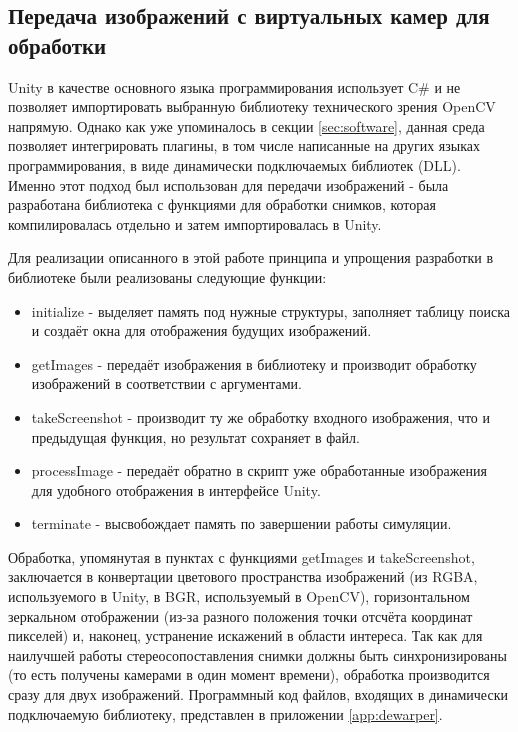 \subsection{Передача изображений с виртуальных камер для обработки}

Unity в качестве основного языка программирования использует C\# и не позволяет импортировать 
выбранную библиотеку технического зрения OpenCV напрямую. Однако как уже упоминалось в секции 
\ref{sec:software}, данная среда позволяет интегрировать плагины, в том числе написанные на 
других языках программирования, в виде динамически подключаемых библиотек (DLL). Именно этот 
подход был использован для передачи изображений - была разработана библиотека с функциями для 
обработки снимков, которая компилировалась отдельно и затем импортировалась в Unity. 

Для реализации описанного в этой работе принципа и упрощения разработки в библиотеке были реализованы 
следующие функции:
\begin{itemize}
    \item initialize - выделяет память под нужные структуры, заполняет таблицу поиска и создаёт окна 
    для отображения будущих изображений.
    \item getImages - передаёт изображения в библиотеку и производит обработку изображений в 
    соответствии с аргументами. 
    \item takeScreenshot - производит ту же обработку входного изображения, что и предыдущая функция,
     но результат сохраняет в файл. 
    \item processImage - передаёт обратно в скрипт уже обработанные изображения для удобного отображения
    в интерфейсе Unity. 
    \item terminate - высвобождает память по завершении работы симуляции.      
\end{itemize}

Обработка, упомянутая в пунктах с функциями getImages и takeScreenshot, заключается в конвертации 
цветового пространства изображений (из RGBA, используемого в Unity, в BGR, используемый в OpenCV), 
горизонтальном зеркальном отображении (из-за разного положения точки отсчёта координат пикселей)
и, наконец, устранение искажений в области интереса. Так как для наилучшей работы стереосопоставления
снимки должны быть синхронизированы (то есть получены камерами в один момент времени), обработка        %
производится сразу для двух изображений. Программный код файлов, входящих в динамически                 %
подключаемую библиотеку, представлен в приложении \ref{app:dewarper}.

